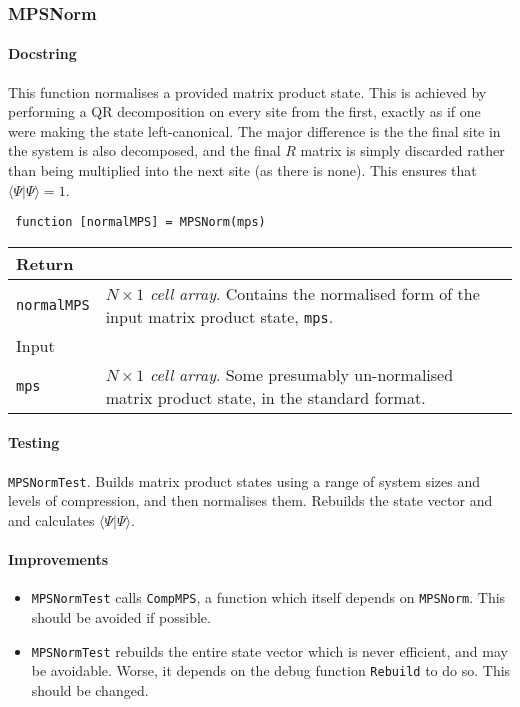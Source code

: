  \subsubsection{MPSNorm}
 \paragraph{Docstring}
 This function normalises a provided matrix product state. This is achieved by performing a QR decomposition on every site from the first, exactly as if one were making the state left-canonical. The major difference is the the final site in the system is also decomposed, and the final \(R\) matrix is simply discarded rather than being multiplied into the next site (as there is none). This ensures that \(\langle \Psi | \Psi \rangle = 1\).
 \begin{lstlisting}
 function [normalMPS] = MPSNorm(mps) \end{lstlisting}
 \begin{longtabu}{X[1,l]X[4,l]}
 \hline
 Return & \\ \hline
 \lstinline$normalMPS$ & \emph{\(N \times 1\) cell array}. Contains the normalised form of the input matrix product state, \lstinline$mps$.  \\ \hline
 Input & \\ \hline
 \lstinline$mps$ & \emph{\(N \times 1\) cell array}. Some presumably un-normalised matrix product state, in the standard format. \\
 \hline
 \end{longtabu}
 \paragraph{Testing}
 \lstinline$MPSNormTest$. Builds matrix product states using a range of system sizes and levels of compression, and then normalises them. Rebuilds the state vector and and calculates \(\langle \Psi | \Psi \rangle\). 
 \paragraph{Improvements}
 \begin{itemize}
 \item \lstinline$MPSNormTest$ calls \lstinline$CompMPS$, a function which itself depends on \lstinline$MPSNorm$. This should be avoided if possible. 
 \item \lstinline$MPSNormTest$ rebuilds the entire state vector which is never efficient, and may be avoidable. Worse, it depends on the debug function \lstinline$Rebuild$ to do so. This should be changed.
 \end{itemize}
 
